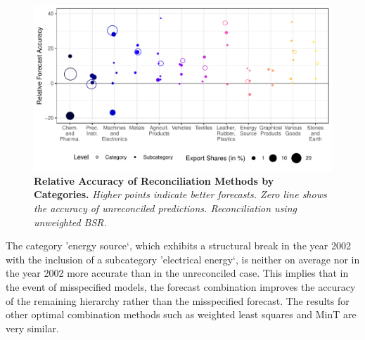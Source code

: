 \documentclass[a4paper,fleqn,11pt]{article}
\begin{document}
\begin{figure}[H]
	\includegraphics[width=\textwidth]{fig/fig_eval_categories}
	\caption[Relative Accuracy of Reconciliation Methods by Categories]{\textbf{Relative Accuracy of Reconciliation Methods by Categories.} \textit{Higher points indicate better forecasts. Zero line shows the accuracy of unreconciled predictions. Reconciliation using unweighted BSR.}}\label{fig:eval_categories}
\end{figure}
The category 'energy source`, which exhibits a structural break in the year 2002 with the inclusion of a subcategory 'electrical energy`, is neither on average nor in the year 2002 more accurate than in the unreconciled case. This implies that in the event of misspecified models, the forecast combination improves the accuracy of the remaining hierarchy rather than the misspecified forecast. The results for other optimal combination methods such as weighted least squares and MinT are very similar.\\
\end{document}
